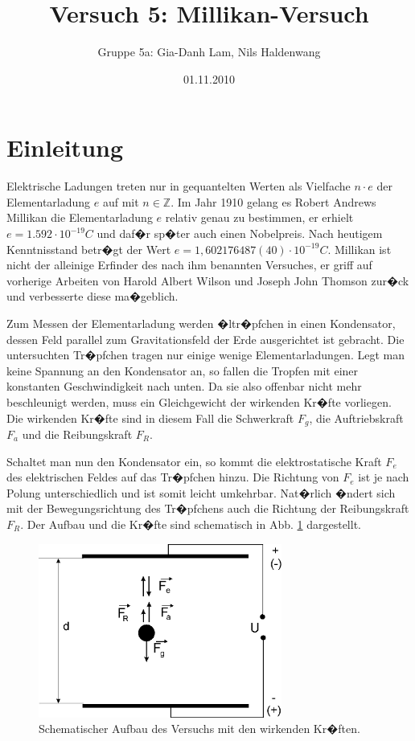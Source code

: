 \documentclass{scrartcl}
\begin{document}
\title{Versuch 5: Millikan-Versuch}


\date{01.11.2010}


\author{Gruppe 5a: Gia-Danh Lam, Nils Haldenwang}

\maketitle
\tableofcontents

\section{Einleitung}
Elektrische Ladungen treten nur in gequantelten Werten als Vielfache
$n \cdot e$ der Elementarladung $e$ auf mit $ n \in \mathbb{Z}$. Im
Jahr 1910 gelang es Robert Andrews Millikan die Elementarladung $e$
relativ genau zu bestimmen, er erhielt $ e = 1.592 \cdot 10^{-19}C$
und daf�r sp�ter auch einen Nobelpreis. Nach heutigem Kenntnisstand
betr�gt der Wert $ e = 1,602 176 487 (40) \cdot 10^{-19} C$. Millikan
ist nicht der alleinige Erfinder des nach ihm benannten Versuches, er
griff auf vorherige Arbeiten von Harold Albert Wilson und Joseph John
Thomson zur�ck und verbesserte diese ma�geblich.

Zum Messen der Elementarladung werden �ltr�pfchen in einen
Kondensator, dessen Feld parallel zum Gravitationsfeld der Erde
ausgerichtet ist gebracht. Die untersuchten Tr�pfchen tragen nur einige wenige
Elementarladungen. Legt man keine Spannung an den Kondensator an, so
fallen die Tropfen mit einer konstanten Geschwindigkeit nach unten. Da
sie also offenbar nicht mehr beschleunigt werden, muss ein
Gleichgewicht der wirkenden Kr�fte vorliegen. Die wirkenden Kr�fte
sind in diesem Fall die Schwerkraft $F_g$, die Auftriebskraft $F_a$ und die
Reibungskraft $F_R$.

Schaltet man nun den Kondensator ein, so kommt die elektrostatische
Kraft $F_e$ des elektrischen Feldes auf das Tr�pfchen hinzu. Die
Richtung von $F_e$ ist je nach Polung unterschiedlich und ist somit
leicht umkehrbar. Nat�rlich �ndert sich mit der Bewegungsrichtung des
Tr�pfchens auch die Richtung der Reibungskraft $F_R$. Der Aufbau und
die Kr�fte sind schematisch in Abb. \ref{fig: Kraefte} dargestellt.

\begin{figure}%
\centering
\includegraphics[width=8cm]{pics/SchemaAufbau}%
\caption{Schematischer Aufbau des Versuchs mit den wirkenden Kr�ften.}%
\label{fig: Kraefte}%
\end{figure}
\end{document}
